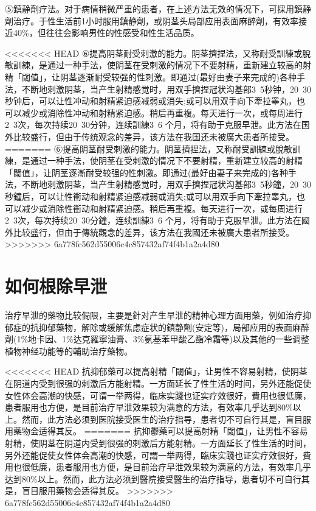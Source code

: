\documentclass[12pt,UTF8]{ctexbook}
\begin{document}
⑤鎮静劑疗法。对于病情稍微严重的患者，在上述方法无效的情况下，可採用鎮静劑治疗。于性生活前1小时服用鎮静劑，或阴茎头局部应用表面麻醉劑，有效率接近40\%，但往往会影响男性的性感受和性生活品质。

<<<<<<< HEAD
⑥提高阴茎耐受刺激的能力。阴茎擠捏法，又称耐受訓練或脫敏訓練，是通过一种手法，使阴茎在受刺激的情况下不要射精，重新建立较高的射精「閾值」，让阴茎逐渐耐受较强的性刺激。即通过(最好由妻子来完成的)各种手法，不断地刺激阴茎，当产生射精感觉时，用双手擠捏冠状沟基部3~5秒钟，20~30秒钟后，可以让性冲动和射精紧迫感减弱或消失;或可以用双手向下牽拉睾丸，也可以减少或消除性冲动和射精紧迫感。稍后再重複。每天进行一次，或每周进行2~3次，每次持续20~30分钟，连续訓練3~6 个月，将有助于克服早泄。此方法在国外比较盛行，但由于传统观念的差异，该方法在我国还未被廣大患者所接受。
=======
⑥提高阴茎耐受刺激的能力。阴茎擠捏法，又称耐受訓練或脫敏訓練，是通过一种手法，使阴茎在受刺激的情况下不要射精，重新建立较高的射精「閾值」，让阴茎逐漸耐受较强的性刺激。即通过(最好由妻子来完成的)各种手法，不断地刺激阴茎，当产生射精感觉时，用双手擠捏冠状沟基部3~5秒鐘，20~30秒鐘后，可以让性衝动和射精紧迫感减弱或消失;或可以用双手向下牽拉睾丸，也可以减少或消除性衝动和射精紧迫感。稍后再重複。每天进行一次，或每周进行2~3次，每次持续20~30分鐘，连续訓練3~6 个月，将有助于克服早泄。此方法在國外比较盛行，但由于傳統觀念的差异，该方法在我國还未被廣大患者所接受。
>>>>>>> 6a778fc562d55006c4c857432af74f4b1a2a4d80

\section{如何根除早泄}

治疗早泄的藥物比较侷限，主要是針对产生早泄的精神心理方面用藥，例如治疗抑郁症的抗抑郁藥物，解除或缓解焦虑症状的鎮静劑(安定等)，局部应用的表面麻醉劑(1\%地卡因、1\%达克羅寧油膏、3\%氨基苯甲酸乙酯冷霜等)以及其他的一些调整植物神经功能等的輔助治疗藥物。

<<<<<<< HEAD
抗抑郁藥可以提高射精「閾值」，让男性不容易射精，使阴茎在阴道内受到很强的刺激后方能射精。一方面延长了性生活的时间，另外还能促使女性体会高潮的快感，可谓一举两得，临床实踐也证实疗效很好，費用也很低廉，患者服用也方便，是目前治疗早泄效果较为满意的方法，有效率几乎达到80\%以上。然而，此方法必须到医院接受医生的治疗指导，患者切不可自行其是，盲目服用藥物会适得其反。
=======
抗抑鬱藥可以提高射精「閾值」，让男性不容易射精，使阴茎在阴道内受到很强的刺激后方能射精。一方面延长了性生活的时间，另外还能促使女性体会高潮的快感，可謂一举两得，臨床实踐也证实疗效很好，費用也很低廉，患者服用也方便，是目前治疗早泄效果较为满意的方法，有效率几乎达到80\%以上。然而，此方法必须到醫院接受醫生的治疗指导，患者切不可自行其是，盲目服用藥物会适得其反。
>>>>>>> 6a778fc562d55006c4c857432af74f4b1a2a4d80
\end{document}
